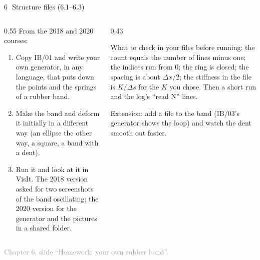 \documentclass[aspectratio=169,11pt]{beamer}
\newcommand{\sourcecredit}[1]{\vfill\begin{flushright}\tiny\textcolor{DarkGray}{#1}\end{flushright}}
\begin{document}
\begin{frame}{6\,\textbullet\ Structure files (6.1--6.3)}
\label{fr:c6x1}
\begin{columns}[T,onlytextwidth]
\begin{column}{0.55\textwidth}
From the 2018 and 2020 courses:
\begin{enumerate}
  \item[6.1] Copy IB/01 and write your own generator, in any language, that puts down the  points and the  springs of a rubber band.
  \item[6.2] Make the band  and deform it initially in a different way (an ellipse the other way, a square, a band with a dent).
  \item[6.3] Run it and look at it in VisIt. The 2018 version asked for two screenshots of the band oscillating; the 2020 version for the generator and the pictures in a shared folder.
\end{enumerate}
\end{column}
\begin{column}{0.43\textwidth}
\begin{punchbox}
\small What to check in your files before running: the count equals the number of lines minus one; the indices run from 0; the ring is closed; the spacing is about $\Delta x/2$; the stiffness in the file is $K/\Delta s$ for the $K$ you chose. Then a short run and the log's ``read N'' lines.
\end{punchbox}
\vspace{2mm}
\small {} Extension: add a  file to the band (IB/03's generator shows the loop) and watch the dent smooth out faster.
\end{column}
\end{columns}
\sourcecredit{Chapter 6, slide ``Homework: your own rubber band''.}
\end{frame}
\end{document}
